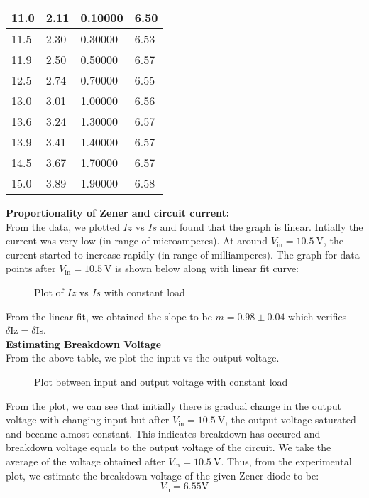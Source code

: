 \documentclass{scrartcl}
\begin{document}
\begin{longtable}{|l|l|l|l|}
        11.0     & 2.11    & 0.10000       & 6.50    \\ \hline
        11.5   & 2.30    & 0.30000       & 6.53    \\ \hline
        11.9   & 2.50    & 0.50000       & 6.57    \\ \hline
        12.5   & 2.74    & 0.70000       & 6.55    \\ \hline
        13.0     & 3.01    & 1.00000       & 6.56    \\ \hline
        13.6   & 3.24    & 1.30000       & 6.57    \\ \hline
        13.9   & 3.41    & 1.40000       & 6.57    \\ \hline
        14.5   & 3.67    & 1.70000       & 6.57    \\ \hline
        15.0     & 3.89    & 1.90000       & 6.58    \\ \hline
        \end{longtable}
        
\noindent
\textbf{Proportionality of Zener and circuit current:}\\[0.3cm]
From the data, we plotted $Iz$ vs $Is$ and found that the graph is linear. Intially the current was very low (in range of microamperes). At around $V_{\mathrm{in}} = \SI{10.5}{\volt}$, the current started to increase rapidly (in range of milliamperes). The graph for data points after $V_{\mathrm{in}} = \SI{10.5}{\volt}$ is shown below along with linear fit curve:
\begin{figure}[H]
        \centering
        
        \caption{Plot of $Iz$ vs $Is$ with constant load}
\end{figure}
\noindent
From the linear fit, we obtained the slope to be $m = 0.98\pm0.04$ which verifies $\delta \mathrm{Iz} = \delta \mathrm{Is}$.\\[0.3cm]
\textbf{Estimating Breakdown Voltage}\\[0.3cm]
From the above table, we plot the input vs the output voltage. 
\begin{figure}[H]
        \centering
        
        \caption{Plot between input and output voltage with constant load}
\end{figure}
\noindent
From the plot, we can see that initially there is gradual change in the output voltage with changing input but after $V_{\mathrm{in}} = \SI{10.5}{\volt}$, the output voltage saturated and became almost constant. This indicates breakdown has occured and breakdown voltage equals to the output voltage of the circuit.
We take the average of the voltage obtained after $V_{\mathrm{in}} = \SI{10.5}{\volt}$. Thus, from the experimental plot, we estimate the breakdown voltage of the given Zener diode to be:
$$\boxed{V_\mathrm{b} = 6.55 \mathrm{V}}$$
\end{document}
